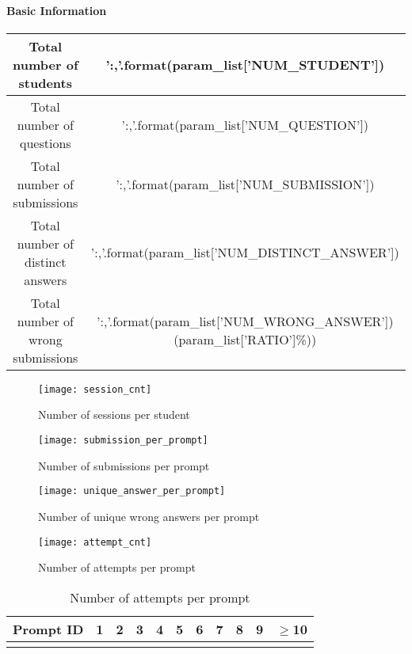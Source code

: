 \documentclass[12pt]{article} %
\begin{document}
\setlength{\pdfpageheight}{\paperheight}
\setlength{\pdfpagewidth}{\paperwidth}
\setlength{\parindent}{0pt} %
\setlength{\parskip}{2ex} %

\paragraph{Basic Information}
\begin{center}
	\begin{tabular}{cc}
		\toprule
		Total number of students & {{'{:,}'.format(param_list['NUM_STUDENT'])}} \\\midrule
		Total number of questions & {{'{:,}'.format(param_list['NUM_QUESTION'])}} \\\midrule
		Total number of submissions & {{'{:,}'.format(param_list['NUM_SUBMISSION'])}} \\\midrule
		Total number of distinct answers & {{'{:,}'.format(param_list['NUM_DISTINCT_ANSWER'])}} \\\midrule
		Total number of wrong submissions & {{'{:,}'.format(param_list['NUM_WRONG_ANSWER'])}}({{param_list['RATIO']}}\%)) \\\bottomrule
	\end{tabular}
\end{center}

\begin{figure}[!ht]
	\centering
	\texttt{[image: session\_cnt]}
	\caption{Number of sessions per student}
\end{figure}

\begin{figure}[!ht]
	\centering
	\texttt{[image: submission\_per\_prompt]}
	\caption{Number of submissions per prompt}
\end{figure}

\begin{figure}[!ht]
	\centering
	\texttt{[image: unique\_answer\_per\_prompt]}
	\caption{Number of unique wrong answers per prompt}
\end{figure}

\begin{figure}[!ht]
	\centering
	\texttt{[image: attempt\_cnt]}
	\caption{Number of attempts per prompt}
\end{figure}

\begin{table}[!ht]
	\centering
	\begin{tabular}{ccccccccccc}
		Prompt ID & 1 & 2  & 3  & 4  & 5  & 6  & 7  & 8  & 9 & $\geq$10 \\\toprule
		{%
			{{prompt}} {%
		{%
	\end{tabular}
	\caption{Number of attempts per prompt}
\end{table}
\end{document}
